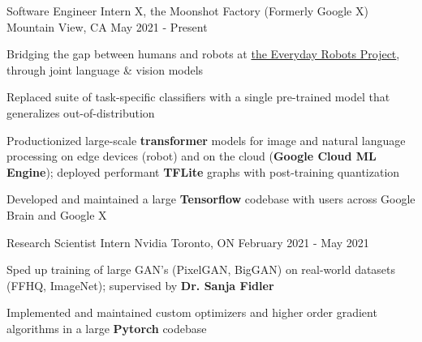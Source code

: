 
\begin{cventries}
  \cventry
    {Software Engineer Intern} %
    {X, the Moonshot Factory (Formerly Google X)} %
    {Mountain View, CA} %
    {May 2021 - Present} %
    {
      \begin{cvitems} %
        \item {Bridging the gap between humans and robots at \underline{the Everyday Robots Project}, through joint language \& vision models}
        \item {Replaced suite of task-specific classifiers with a single pre-trained model that generalizes out-of-distribution}
        \item {Productionized large-scale \textbf{transformer} models for image and natural language processing on edge devices (robot) and on the cloud (\textbf{Google Cloud ML Engine}); deployed performant \textbf{TFLite} graphs with post-training quantization}
        \item {Developed and maintained a large \textbf{Tensorflow} codebase with users across Google Brain and Google X}
      \end{cvitems}
    }

  \cventry
    {Research Scientist Intern} %
    {Nvidia} %
    {Toronto, ON} %
    {February 2021 - May 2021} %
    {
      \begin{cvitems} %
        \item {Sped up training of large GAN's (PixelGAN, BigGAN) on real-world datasets (FFHQ, ImageNet); supervised by \textbf{Dr. Sanja Fidler}}
        \item {Implemented and maintained custom optimizers and higher order gradient algorithms in a large \textbf{Pytorch} codebase}
      \end{cvitems}
    }
  

\end{cventries}
